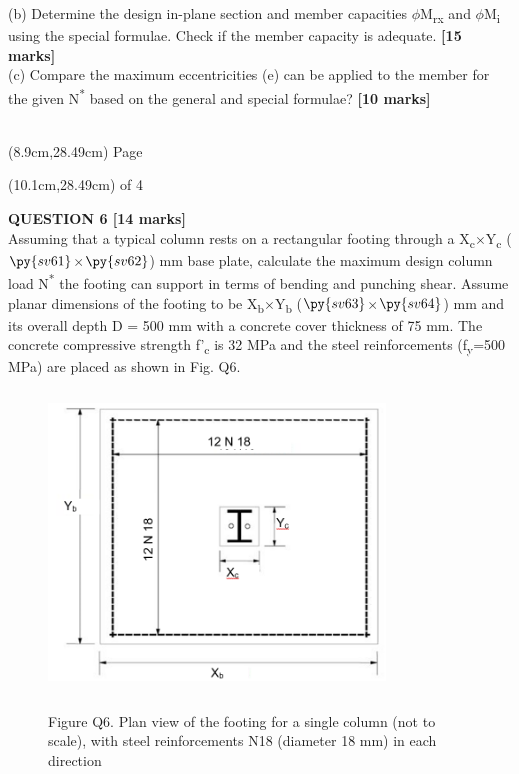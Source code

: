 \documentclass[a4paper,11pt]{article}
\begin{document}
(b)	Determine the design in-plane section and member capacities $\phi$M\textsubscript{rx} and $\phi$M\textsubscript{i} using the special formulae. Check if the member capacity is adequate. \textbf{[15 marks]}\\
(c)	Compare the maximum eccentricities (e) can be applied to the member for the given N\textsuperscript{*} based on the general and special formulae? \textbf{[10 marks]}\\
\\
\begin{textblock*}{5cm}(8.9cm,28.49cm)
Page
\end{textblock*}
\begin{textblock*}{5cm}(10.1cm,28.49cm)
of 4
\end{textblock*}
\newpage
\noindent
\textbf{QUESTION 6 [14 marks]}\\
Assuming that a typical column rests on a rectangular footing through a X\textsubscript{c}$\times$Y\textsubscript{c} ($\py{sv61}$$\times$$\py{sv62}$)  mm base plate, calculate the maximum design column load N\textsuperscript{*} the footing can support in terms of bending and punching shear. Assume planar dimensions of the footing to be X\textsubscript{b}$\times$Y\textsubscript{b} ($\py{sv63}$$\times$$\py{sv64}$) mm and its overall depth D = 500 mm with a concrete cover thickness of 75 mm. The concrete compressive strength f'\textsubscript{c} is 32 MPa and the steel reinforcements (f\textsubscript{y}=500 MPa) are placed as shown in Fig. Q6.\\
\begin{figure}[ht]
\includegraphics[width=8.94cm, height=8cm]{P6.png}\\
{\centering Figure Q6. Plan view of the footing for a single column (not to scale), with steel reinforcements N18 (diameter 18 mm) in each direction\par}\\
\end{figure}
\end{document}
